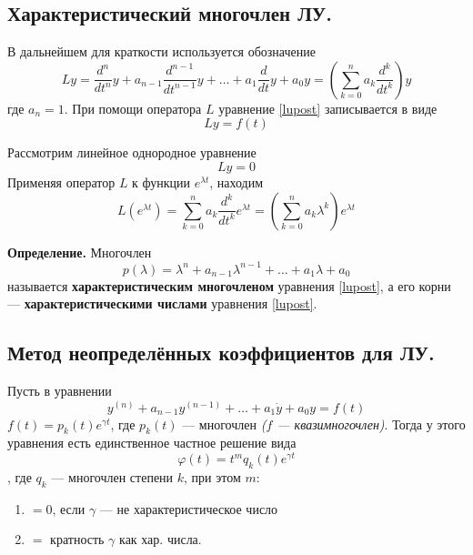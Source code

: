 \subsection*{Характеристический многочлен ЛУ.}

В дальнейшем для краткости используется обозначение
\begin{equation*}
    Ly = \frac{d^n}{dt^n}y + a_{n-1}\frac{d^{n-1}}{dt^{n-1}}y + \ldots + a_1\frac{d}{dt}y + a_0y = \left(\sum_{k = 0}^n a_k\frac{d^k}{dt^k} \right)y
\end{equation*}
где $a_n = 1$. При помощи оператора $L$ уравнение \eqref{lupost} записывается в виде
\begin{equation*}
    Ly = f(t)
\end{equation*}

Рассмотрим линейное однородное уравнение
\begin{equation}
    Ly = 0 \label{lodnpost}
\end{equation}
Применяя оператор $L$ к функции $e^{\lambda t}$, находим
\begin{equation*}
    L(e^{\lambda t}) = \sum_{k = 0}^n a_k\frac{d^k}{dt^k}e^{\lambda t} = \left(\sum_{k = 0}^n a_k\lambda^k \right)e^{\lambda t}
\end{equation*}

\noindent \textbf{Определение.} Многочлен
\begin{equation*}
    p(\lambda) = \lambda^n + a_{n-1}\lambda^{n-1} + \ldots + a_1\lambda + a_0
\end{equation*}
называется \textbf{характеристическим многочленом} уравнения \eqref{lupost}, а его корни --- \textbf{характеристическими числами} уравнения \eqref{lupost}.

\subsection*{Метод неопределённых коэффициентов для ЛУ.}

Пусть в уравнении
\[y^{(n)} + a_{n - 1}y^{(n - 1)} + \dots + a_1 \dot{y} + a_0 y = f(t)\]
\(f(t) = p_k (t) e^{\gamma t}\), где \(p_k(t)\) --- многочлен \textit{(\(f\) --- квазимногочлен)}. Тогда у этого уравнения есть единственное частное решение вида
\[\varphi(t) = t^m q_k(t) e^{\gamma t}\]
, где \(q_k\) --- многочлен степени \(k\), при этом \(m\):
\begin{enumerate}
    \item \( = 0\), если \(\gamma\) --- не характеристическое число
    \item \( = \) кратность \(\gamma\) как хар. числа.
\end{enumerate}

